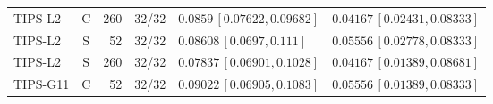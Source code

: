 \begin{longtable}{lcrcp{44mm}p{44mm}}
TIPS-L2 & C & 260 & 32/32 & \(0.0859\,[0.07622,0.09682]\) & \(0.04167\,[0.02431,0.08333]\)\\
TIPS-L2 & S & 52 & 32/32 & \(0.08608\,[0.0697,0.111]\) & \(0.05556\,[0.02778,0.08333]\)\\
TIPS-L2 & S & 260 & 32/32 & \(0.07837\,[0.06901,0.1028]\) & \(0.04167\,[0.01389,0.08681]\)\\
TIPS-G11 & C & 52 & 32/32 & \(0.09022\,[0.06905,0.1083]\) & \(0.05556\,[0.01389,0.08333]\)\\

\end{longtable}
